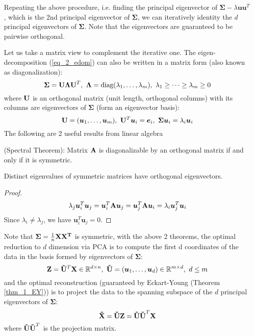 \documentclass[../book-template.tex]{subfiles}
\begin{document}
\par Repeating the above procedure, i.e. finding the principal eigenvector of $\bm{\Sigma}-\lambda \bm{uu}^T$, which is the 2nd principal eigenvector of $\bm{\Sigma}$, we can iteratively identity the $d$ principal eigenvectors of $\bm{\Sigma}$. Note that the eigenvectors are guaranteed to be pairwise orthogonal.
\par Let us take a matrix view to complement the iterative one. The eigen-decomposition (\ref{eq_2_edom}) can also be written in a matrix form (also known as diagonalization):
\begin{equation*}
    {\bf \Sigma = U\Lambda U}^T,\ {\bf \Lambda} =\text{diag}(\lambda_1,\dots, \lambda_m),\ \lambda_1\geq\dots\geq\lambda_m\geq 0
\end{equation*}
where ${\bf U}$ is an orthogonal matrix (unit length, orthogonal columns) with its columns are eigenvectors of $\bm{\Sigma}$ (form an eigenvector basis):
\begin{equation*}
    {\bf U}=(\bm{u}_1,\dots,\bm{u}_m),\ {\bf U}^T\bm{u}_i=\bm{e}_i,\ \bm{\Sigma u}_i = \lambda_i\bm{u}_i
\end{equation*}
The following are 2 useful results from linear algebra
\begin{theorem}\label{thm_2_spectral}
(Spectral Theorem): Matrix ${\bf A}$ is diagonalizable by an orthogonal matrix if and only if it is symmetric.
\end{theorem}
\begin{theorem}
Distinct eigenvalues of symmetric matrices have orthogonal eigenvectors.
\end{theorem}
\begin{proof}
\begin{equation*}
    \lambda_j \bm{u}_i^T\bm{u}_j = \bm{u}_i^T{\bf A}\bm{u}_j = \bm{u}_j^T{\bf A}\bm{u}_i = \lambda_i \bm{u}_j^T\bm{u}_i
\end{equation*}
Since $\lambda_i\neq \lambda_j$, we have $\bm{u}_i^T\bm{u}_j=0$.
\end{proof}
\vbox{}
\par Note that $\bm{\Sigma}=\frac{1}{n}{\bf XX^T}$ is symmetric, with the above 2 theorems, the optimal reduction to $d$ dimension via PCA is to compute the first d coordinates of the data in the basis formed by eigenvectors of $\bm{\Sigma}$:
\begin{equation*}
    {\bf Z}={\bf \tilde{U}}^T{\bf X}\in \mathbb{R}^{d\times n},\ {\bf \tilde{U}} = (\bm{u}_1,\dots,\bm{u}_d)\in\mathbb{R}^{m\times d},\ d\leq m
\end{equation*}
and the optimal reconstruction (guaranteed by Eckart-Young (Theorem \ref{thm_1_EY})) is to project the data to the spanning subspace of the $d$ principal eigenvectors of $\bm{\Sigma}$:
\begin{equation*}
    {\bf \tilde{X}}={\bf \tilde{U}Z} = {\bf \tilde{U}\tilde{U}}^T{\bf X}
\end{equation*}
where ${\bf \tilde{U}\tilde{U}}^T$ is the projection matrix.
\end{document}
